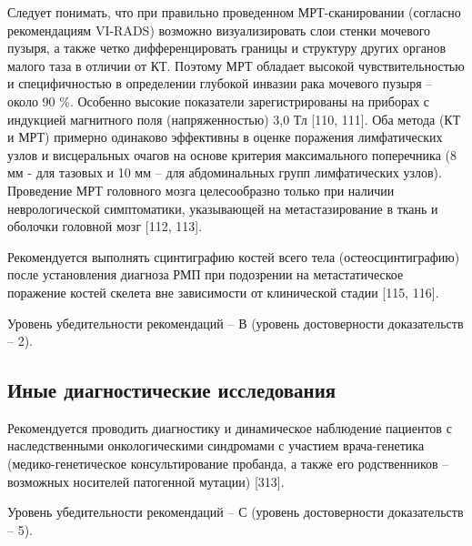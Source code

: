 Следует понимать, что при правильно проведенном МРТ-сканировании (согласно рекомендациям VI-RADS) возможно визуализировать слои стенки мочевого пузыря, а также четко дифференцировать границы и структуру других органов малого таза в отличии от КТ. Поэтому МРТ обладает высокой чувствительностью и специфичностью в определении глубокой инвазии рака мочевого пузыря – около 90 \%. Особенно высокие показатели зарегистрированы на приборах с индукцией магнитного поля (напряженностью) 3,0 Тл [110, 111]. Оба метода (КТ и МРТ) примерно одинаково эффективны в оценке поражения лимфатических узлов и висцеральных очагов на основе критерия максимального поперечника (8 мм - для тазовых и 10 мм – для абдоминальных групп лимфатических узлов). Проведение МРТ головного мозга целесообразно только при наличии неврологической симптоматики, указывающей на метастазирование в ткань и оболочки головной мозг [112, 113].

Рекомендуется выполнять сцинтиграфию костей всего тела (остеосцинтиграфию) после установления диагноза РМП при подозрении на метастатическое поражение костей скелета вне зависимости от клинической стадии [115, 116].

Уровень убедительности рекомендаций – В (уровень достоверности доказательств – 2).
\subsection{Иные диагностические исследования}
\label{sec:}
Рекомендуется проводить диагностику и динамическое наблюдение пациентов с наследственными онкологическими синдромами с участием врача-генетика (медико-генетическое консультирование пробанда, а также его родственников – возможных носителей патогенной мутации) [313].

Уровень убедительности рекомендаций – С (уровень достоверности доказательств – 5).

